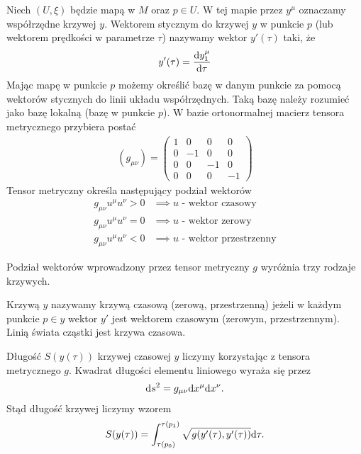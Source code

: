 \begin{definition}
Niech $(U,\xi)$ będzie mapą w $M$ oraz $p\in U$. W tej mapie 
przez $y^\mu$ oznaczamy współrzędne krzywej $y$.
Wektorem stycznym do krzywej $y$ w punkcie $p$  
(lub wektorem prędkości w 
parametrze $\tau$) nazywamy wektor $y'(\tau)$ taki, że
\begin{align*}
y' (\tau )= \frac{\text{d} y_1^\mu }{\text{d} \tau}
\end{align*}
Mając mapę w punkcie $p$ możemy określić bazę w danym punkcie
za pomocą wektorów stycznych do linii układu współrzędnych.
Taką bazę należy rozumieć jako bazę lokalną (bazę w punkcie $p$).
W bazie ortonormalnej macierz tensora metrycznego
przybiera postać 
\begin{align*}
( g_{\mu\nu} ) = \left(
\begin{array}{cccc}
1 & 0 & 0 & 0\\
0 & -1 & 0 & 0 \\
0 & 0 & -1 & 0 \\
0 & 0 & 0 & -1 
\end{array}
\right)
\end{align*}
Tensor metryczny określa następujący podział wektorów
\begin{align*}
g_{\mu\nu}u^\mu u^\nu > 0& \implies u \text{ - wektor czasowy}\\
g_{\mu\nu}u^\mu u^\nu = 0& \implies u \text{ - wektor zerowy}\\
g_{\mu\nu}u^\mu u^\nu < 0& \implies u \text{ - wektor przestrzenny}
\end{align*}
\end{definition}
Podział wektorów wprowadzony przez tensor metryczny $g$ 
wyróżnia trzy rodzaje krzywych. 
\begin{definition}
Krzywą $y$ nazywamy krzywą czasową (zerową, przestrzenną)
jeżeli w każdym punkcie $p \in y$ wektor $y'$ jest 
wektorem czasowym
(zerowym, przestrzennym). Linią świata cząstki
jest krzywa czasowa. 
\end{definition}
Długość $S(y(\tau))$ krzywej czasowej $y$ liczymy 
korzystając z tensora metrycznego $g$. 
Kwadrat długości elementu liniowego wyraża się przez
\begin{align*}
\text{d} s^2 = g_{\mu\nu} \text{d} x^\mu \text{d} x^\nu.
\end{align*}
Stąd długość krzywej liczymy wzorem
\begin{align}\label{dlugosc_krzywej}
S( y(\tau) ) = \int_{\tau(p_0)}^{\tau(p_1)} \sqrt{g (
y' (\tau), y' (\tau) )} \text{d} \tau.
\end{align}
